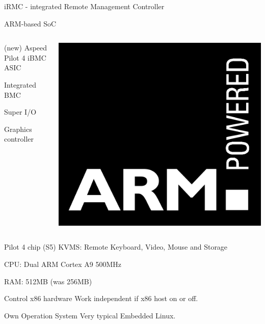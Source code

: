 \documentclass{beamer}
\begin{document}
  \begin{frame}{iRMC - integrated Remote Management Controller}
	  \begin{block}{ARM-based SoC}
		  \begin{columns}[onlytextwidth]
			  \begin{column}{0.7\textwidth}

				  (new) Aspeed Pilot 4 iBMC ASIC

				  Integrated BMC 

				  Super I/O

				  Graphics controller

			  \end{column}
			  \begin{column}{0.2\textwidth}
				  \includegraphics[width=\textwidth]{logo/ARM_powered.png}
			  \end{column}
		  \end{columns}
	  \end{block}
	  \pause

	  \begin{block}{Pilot 4 chip (S5)}
		  KVMS: Remote Keyboard, Video, Mouse and Storage

		  CPU: Dual ARM Cortex A9 500MHz
			
		  RAM: 512MB (was 256MB)
	  \end{block}
	  \pause

	  \begin{block}{Control x86 hardware}
		  Work independent if x86 host on or off.
	  \end{block}
	  \pause

	  \begin{block}{Own Operation System}
		  Very typical Embedded Linux.
	  \end{block}
	  
  \end{frame}
\end{document}
